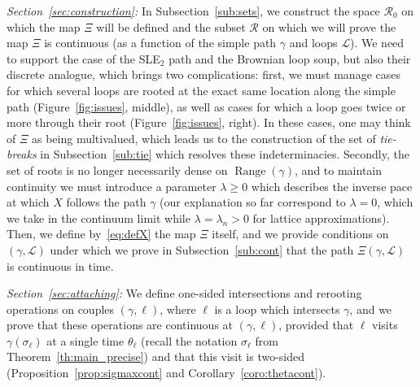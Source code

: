 \documentclass[11pt]{article}
\DeclareMathOperator{\Range}{Range}
\def\Conf{{\mathscr{R}}}
\def\Att{{\Xi}}
\begin{document}
\emph{\it Section~\ref{sec:construction}:} In Subsection~\ref{sub:sets}, we construct the space $\Conf_0$ on which the map $\Att$ will be defined and the subset $\Conf$ on which we will prove the map $\Att$ is continuous (as a function of the simple path $\gamma$ and loops $\mathcal{L}$). We need to support the case of the SLE$_2$ path and the Brownian loop soup, but also their discrete analogue, which brings two complications: first, we must manage cases for which several loops are rooted at the exact same location along the simple path (Figure~\ref{fig:issues}, middle), as well as cases for which a loop goes twice or more through their root (Figure~\ref{fig:issues}, right). In these cases, one may think of $\Att$ as being multivalued, which leads us to the construction of the set of {\it tie-breaks} in Subsection~\ref{sub:tie} which resolves these  indeterminacies. Secondly, the set of roots is no longer necessarily dense on $\Range(\gamma)$, and to maintain continuity we must introduce a parameter $\lambda\geq 0$ which describes the inverse pace at which $X$ follows the path $\gamma$ (our explanation so far correspond to $\lambda=0$,
which we take in the continuum limit while $\lambda=\lambda_n>0$ for lattice approximations). Then, we define by~\eqref{eq:defX} the map $\Att$ itself, and we provide conditions on $(\gamma,\mathcal{L})$ under which we prove in Subsection~\ref{sub:cont} that the path $\Att(\gamma,\mathcal{L})$ is continuous in time.


%

\emph{\it Section~\ref{sec:attaching}:} We define one-sided intersections and rerooting operations on couples $(\gamma, \ell)$, where $\ell$ is a loop which intersects $\gamma$, and we prove that these operations
are continuous at $(\gamma,\ell)$, provided that $\ell$ visits $\gamma(\sigma_\ell)$ at a single time $\theta_\ell$ (recall the notation $\sigma_\ell$ from Theorem~\ref{th:main_precise}) and that this visit is two-sided (Proposition~\ref{prop:sigmaxcont} and Corollary~\ref{coro:thetacont}).
\end{document}
